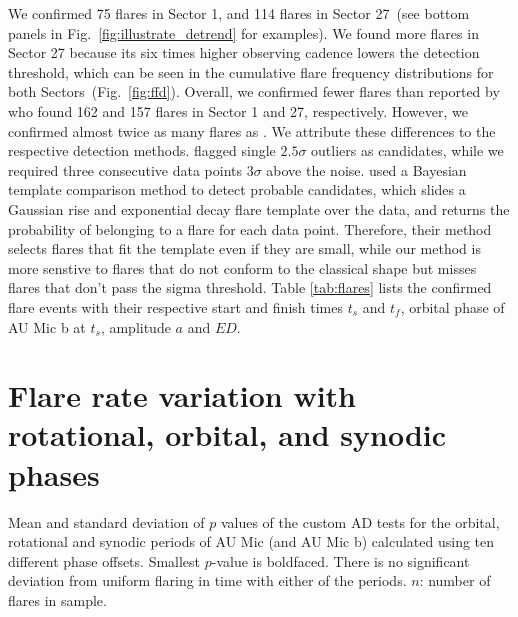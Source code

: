 \documentclass[fleqn,usenatbib,letters]{mnras}%
\begin{document}
We confirmed 75 flares in Sector 1, and 114 flares in Sector 27~(see bottom panels in Fig.~\ref{fig:illustrate_detrend} for examples). We found more flares in Sector 27 because its six times higher observing cadence lowers the detection threshold, which can be seen in the cumulative flare frequency distributions for both Sectors~(Fig.~\ref{fig:ffd}). Overall, we confirmed fewer flares than reported by \citet{martioli2021new} who found 162 and 157 flares in Sector 1 and 27, respectively. However, we confirmed almost twice as many flares as \citet{gilbert2021flares}. We attribute these differences to the respective detection methods. \citet{martioli2021new} flagged single $2.5\sigma$ outliers as candidates, while we required three consecutive data points $3\sigma$ above the noise. \citet{gilbert2021flares} used a Bayesian template comparison method to detect probable candidates, which slides a Gaussian rise and exponential decay flare template over the data, and returns the probability of belonging to a flare for each data point. Therefore, their method selects flares that fit the template even if they are small, while our method is more senstive to flares that do not conform to the classical shape but misses flares that don't pass the sigma threshold. Table \ref{tab:flares} lists the confirmed flare events with their respective start and finish times $t_s$ and $t_f$, orbital phase of AU Mic b at $t_s$, amplitude $a$ and $ED$.
\section{Flare rate variation with rotational, orbital, and synodic phases}
\label{sec:phases}



\begin{table}
\caption{Mean and standard deviation of $p$ values of the custom AD tests for the orbital, rotational and synodic periods of AU Mic (and AU Mic b) calculated using ten different phase offsets. Smallest $p$-value is boldfaced. There is no significant deviation from uniform flaring in time with either of the periods. $n$: number of flares in sample.}
\centering

\label{tab:pvals}
\end{table}
\end{document}
